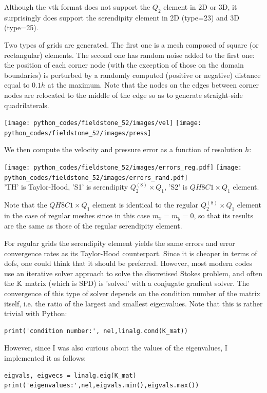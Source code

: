 Although the vtk format does not support the $Q_2$ element in 2D or 3D, it surprisingly does
support the serendipity element in 2D (type=23) and 3D (type=25).

Two types of grids are generated. The first one is a mesh composed of square (or rectangular)
elements. The second one has random noise added to the first one: the position of each corner 
node (with the exception of those on the domain boundaries) is perturbed by a randomly computed 
(positive or negative) distance equal to $0.1h$ at the maximum. Note that the nodes
on the edges between corner nodes are relocated to the middle of the edge so as to generate
straight-side quadrilaterals.

\begin{center}
\texttt{[image: python\_codes/fieldstone\_52/images/vel]}
\texttt{[image: python\_codes/fieldstone\_52/images/press]}
\end{center}

We then compute the velocity and pressure error as a function of resolution $h$:

\begin{center}
\texttt{[image: python\_codes/fieldstone\_52/images/errors\_reg.pdf]}
\texttt{[image: python\_codes/fieldstone\_52/images/errors\_rand.pdf]}\\
{\captionfont 'TH' is Taylor-Hood, 'S1' is serendipity $Q_2^{(8)}\times Q_1$, 'S2' is $QH8C1\times Q_1$ element.}
\end{center}

Note that the $QH8C1\times Q_1$ element is identical to the regular $Q_2^{(8)}\times Q_1$ element 
in the case of regular meshes since in this case $m_x=m_y=0$, so that its results are the same as those 
of the regular serendipity element. 

For regular grids the serendipity element yields the same errors and error convergence 
rates as its Taylor-Hood counterpart. Since it is cheaper in terms of dofs, 
one could think that it should be preferred. However, most modern codes 
use an iterative solver approach to solve the discretised Stokes problem, and 
often the ${\mathbb{K}}$ matrix (which is SPD) is 'solved' with a conjugate gradient solver.  
The convergence of this type of solver depends on the condition number of the matrix
itself, i.e. the ratio of the largest and smallest eigenvalues. 
Note that this is rather trivial with Python:

\begin{lstlisting}
print('condition number:', nel,linalg.cond(K_mat))
\end{lstlisting}
However, since I was also curious about the values of the eigenvalues, I implemented 
it as follows:
\begin{lstlisting}
eigvals, eigvecs = linalg.eig(K_mat)
print('eigenvalues:',nel,eigvals.min(),eigvals.max())
\end{lstlisting}

